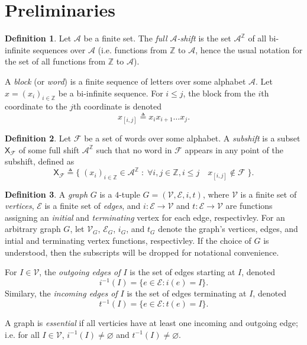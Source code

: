 \documentclass{article}
\newcommand{\Ac}{\mathcal{A}}  %
\newcommand{\Vc}{\mathcal{V}}
\newcommand{\Ec}{\mathcal{E}}
\newcommand{\Fc}{\mathcal{F}}
\newcommand{\shift}[1]{\mathsf{X}_{#1}}
\newcommand{\term}[1]{\textit{#1}}
\theoremstyle{definition}
\newtheorem{definition}{Definition}
\begin{document}
\section{Preliminaries}

\begin{definition}
    Let \(\Ac\) be a finite set. The \term{full \(\Ac\)-shift} is the set \(\Ac^\mathbb{Z}\) of all 
    bi-infinite sequences over \(\Ac\) (i.e. functions from \(\mathbb{Z}\) to \(\Ac\), hence the 
    usual notation for the set of all functions from \(\mathbb{Z}\) to \(\Ac\)).
\end{definition}

\noindent A \term{block} (or \term{word}) is a finite sequence of letters over some alphabet \(\Ac\). 
Let \(x=(x_i)_{i \in \mathbb{Z}}\) be a bi-infinite sequence. For \(i \leq j\), the block from the 
\(i\)th coordinate to the \(j\)th coordinate is denoted \[x_{[i,j]} \triangleq x_i x_{i+1} \dots x_{j}.\]

\begin{definition}
    Let \(\Fc\) be a set of words over some alphabet. A \term{subshift} is a subset \(\shift{\Fc}\)
    of some full shift \(\Ac^\mathbb{Z}\) such that no word in \(\Fc\) appears in any point of the subshift,
    defined as
    \[\shift{\Fc} \triangleq \Big\{ \; (x_i)_{i \in \mathbb{Z}} \in \Ac^\mathbb{Z} \; : \; \forall i, j \in \mathbb{Z}, i\leq j \quad  x_{[i,j]} \notin \Fc \; \Big\}.\]
\end{definition}

\begin{definition}
    A \term{graph} \(G\) is a \(4\)-tuple \(G = (\Vc, \Ec, i, t)\), where \(\Vc\) is a finite 
    set of \term{vertices}, \(\Ec\) is a finite set of \term{edges}, and \(i : \Ec \to \Vc\) and 
    \(t : \Ec \to \Vc\) are functions assigning an \term{initial} and \term{terminating} vertex for 
    each edge, respectivley. For an arbitrary graph \(G\), let 
    \(\Vc_G\), \(\Ec_G\), \(i_G\), and \(t_G\) denote the graph's vertices, edges, and 
    intial and terminating vertex functions, respectivley. If the choice 
    of \(G\) is understood, then the subscripts will be dropped for notational convenience.

    For \(I \in \Vc\), the \term{outgoing edges of \(I\)} is the set of edges starting at \(I\),
    denoted 
    \[i^{-1}(I) = \{e \in \Ec : i(e) = I\}.\]
    Similary, the \term{incoming edges of \(I\)} is the set of edges terminating at \(I\), 
    denoted
    \[t^{-1}(I) = \{e \in \Ec : t(e) = I\}.\]

    A graph is \term{essential} if all verticies have at least one incoming and outgoing edge;
    i.e. for all \(I \in \Vc\), \(i^{-1}(I) \ne \varnothing\) and \(t^{-1}(I) \ne \varnothing\).

\end{definition}
\end{document}
